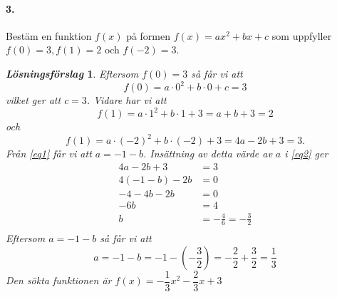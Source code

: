 \documentclass[a4paper]{article}
\newtheorem*{sol}{\normalfont\textit{Lösningsförslag}}
\begin{document}
\paragraph{3.} Bestäm en funktion $f(x)$ på formen $f(x) = ax^2 + bx +c$
som uppfyller $f(0) = 3, f(1) = 2$ och $f(-2) = 3$.
\begin{sol}
  Eftersom $f(0) = 3$ så får vi att
  \[
    f(0) = a\cdot0^2 +b\cdot 0 +c = 3
  \]
  vilket ger att $c = 3$. Vidare har vi att
  \begin{equation}
    \label{eq1}
    f(1) = a\cdot 1^2 + b\cdot 1 +3 = a +b +3 = 2 
  \end{equation}
  och
\begin{equation}
    \label{eq2}
    f(1) = a\cdot (-2)^2 + b\cdot (-2) +3 = 4a -2b +3 = 3.
  \end{equation}
  Från \eqref{eq1} får vi att $a = -1 -b$. Insättning av detta värde
  av $a$ i \eqref{eq2} ger
  \begin{align*}
    4a - 2b + 3 &= 3 \\[1em]
    4(-1-b) -2b &= 0 \\[1em]
    -4-4b -2b &= 0 \\[1em]
    -6b &= 4 \\[1em]
    b &= -\frac{4}{6} = -\frac{3}{2} \\[1em]
  \end{align*}
  Eftersom $a = -1 -b$ så får vi att
  \[
    a= -1 -b = -1 - \left(-\frac{3}{2} \right) = -\frac{2}{2} +
    \frac{3}{2} = \frac{1}{3}
  \]
  Den sökta funktionen är $f(x) = -\dfrac{1}{3}x^2 - \dfrac{2}{3}x + 3$
\end{sol}
\end{document}
